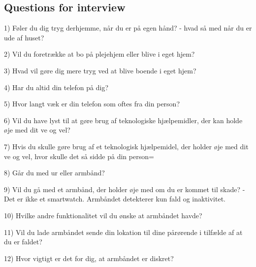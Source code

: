 \subsection{Questions for interview}

1) Føler du dig tryg derhjemme, når du er på egen hånd?
- hvad så med når du er ude af huset?

2) Vil du foretrække at bo på plejehjem eller blive i eget hjem? 

3) Hvad vil gøre dig mere tryg ved at blive boende i eget hjem? 

4) Har du altid din telefon på dig?

5) Hvor langt væk er din telefon som oftes fra din person?

6) Vil du have lyst til at gøre brug af teknologiske hjælpemidler, der kan holde øje med dit ve og vel?

7) Hvis du skulle gøre brug af et teknologisk hjælpemidel, der holder øje med dit ve og vel, hvor skulle det så sidde på din person= 

8) Går du med ur eller armbånd? 

9) Vil du gå med et armbånd, der holder øje med om du er kommet til skade?
- Det er ikke et smartwatch. Armbåndet detekterer kun fald og inaktivitet.

10) Hvilke andre funktionalitet vil du ønske at armbåndet havde? 

11) Vil du lade armbåndet sende din lokation til dine pårørende i tilfælde af at du er faldet? 

12) Hvor vigtigt er det for dig, at armbåndet er diskret?


